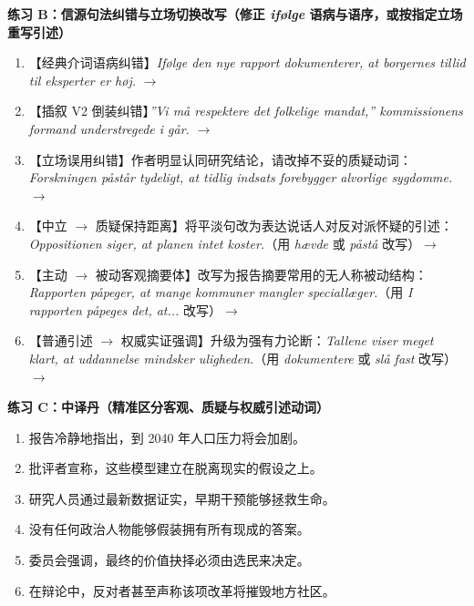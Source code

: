 \textbf{练习 B：信源句法纠错与立场切换改写（修正 \textit{ifølge} 语病与语序，或按指定立场重写引述）}
\begin{enumerate}
  \item 【经典介词语病纠错】\textit{Ifølge den nye rapport dokumenterer, at borgernes tillid til eksperter er høj.} $\rightarrow$
  \item 【插叙 V2 倒装纠错】\textit{”Vi må respektere det folkelige mandat,” kommissionens formand understregede i går.} $\rightarrow$
  \item 【立场误用纠错】作者明显认同研究结论，请改掉不妥的质疑动词：\textit{Forskningen påstår tydeligt, at tidlig indsats forebygger alvorlige sygdomme.} $\rightarrow$
  \item 【中立 $\rightarrow$ 质疑保持距离】将平淡句改为表达说话人对反对派怀疑的引述：\textit{Oppositionen siger, at planen intet koster.}（用 \textit{hævde} 或 \textit{påstå} 改写）$\rightarrow$
  \item 【主动 $\rightarrow$ 被动客观摘要体】改写为报告摘要常用的无人称被动结构：\textit{Rapporten påpeger, at mange kommuner mangler speciallæger.}（用 \textit{I rapporten påpeges det, at...} 改写）$\rightarrow$
  \item 【普通引述 $\rightarrow$ 权威实证强调】升级为强有力论断：\textit{Tallene viser meget klart, at uddannelse mindsker uligheden.}（用 \textit{dokumentere} 或 \textit{slå fast} 改写）$\rightarrow$
\end{enumerate}

\textbf{练习 C：中译丹（精准区分客观、质疑与权威引述动词）}
\begin{enumerate}
  \item 报告冷静地指出，到 2040 年人口压力将会加剧。
  \item 批评者宣称，这些模型建立在脱离现实的假设之上。
  \item 研究人员通过最新数据证实，早期干预能够拯救生命。
  \item 没有任何政治人物能够假装拥有所有现成的答案。
  \item 委员会强调，最终的价值抉择必须由选民来决定。
  \item 在辩论中，反对者甚至声称该项改革将摧毁地方社区。
\end{enumerate}


